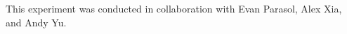 \begin{center}
    This experiment was conducted in collaboration with Evan Parasol, Alex Xia, and Andy Yu.
\end{center}